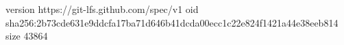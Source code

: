 version https://git-lfs.github.com/spec/v1
oid sha256:2b73cde631e9ddcfa17ba71d646b41dcda00ecc1c22e824f1421a44e38eeb814
size 43864
